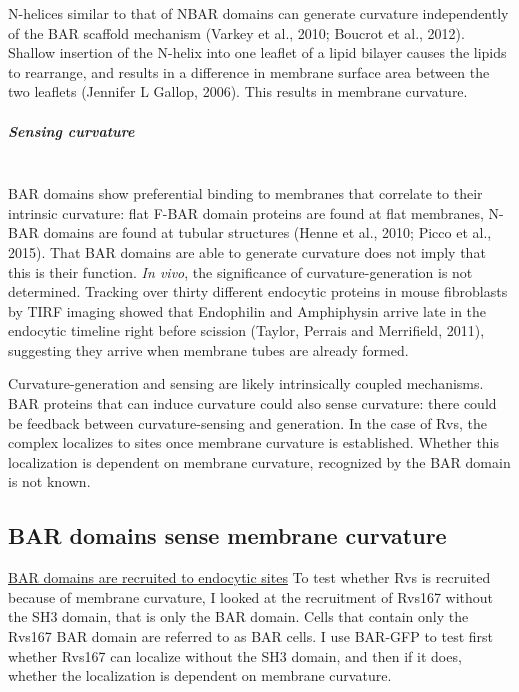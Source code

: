 N-helices similar to that of NBAR domains can generate curvature independently of the BAR scaffold mechanism (Varkey et al., 2010; Boucrot et al., 2012). Shallow insertion of the N-helix into one leaflet of a lipid bilayer causes the lipids to rearrange, and results in a difference in membrane surface area between the two leaflets (Jennifer L Gallop, 2006). This results in membrane curvature. 


	
	\vspace{5mm}
	
				\subparagraph{Sensing curvature }
								\mbox{}\\
BAR domains show preferential binding to membranes that correlate to their intrinsic curvature: flat F-BAR domain proteins are found at flat membranes, N-BAR domains are found at tubular structures (Henne et al., 2010; Picco et al., 2015). That BAR domains are able to generate curvature does not imply that this is their function. \textit{In vivo}, the significance of curvature-generation is not determined. Tracking over thirty different endocytic proteins in mouse fibroblasts by TIRF imaging showed that Endophilin and Amphiphysin arrive late in the endocytic timeline right before scission (Taylor, Perrais and Merrifield, 2011), suggesting they arrive when membrane tubes are already formed. 


	\vspace{5mm}
Curvature-generation and sensing are likely intrinsically coupled mechanisms. BAR proteins that can induce curvature could also sense curvature: there could be feedback between curvature-sensing and generation. In the case of Rvs, the complex localizes to sites once membrane curvature is established. Whether this localization is dependent on membrane curvature, recognized by the BAR domain is not known. 


\newpage

	\subsection{BAR domains sense membrane curvature}
\label{sub_curvature}
	\vspace{2mm}
\underline{BAR domains are recruited to endocytic sites}
To test whether Rvs is recruited because of membrane curvature, I looked at the recruitment of Rvs167 without the SH3 domain, that is only the BAR domain. Cells that contain only the Rvs167 BAR domain are referred to as BAR cells. I use BAR-GFP to test first whether Rvs167 can localize without the SH3 domain, and then if it does, whether the localization is dependent on membrane curvature.

